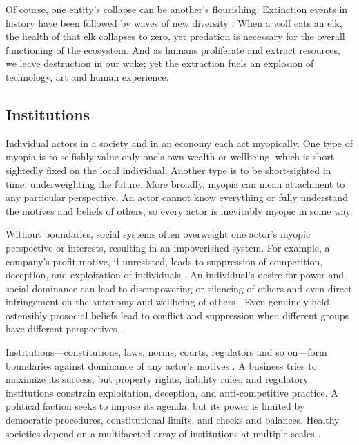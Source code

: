 \documentclass[12pt]{article}
\begin{document}
Of course, one entity's collapse can be another's flourishing. Extinction events in history have been followed by waves of new diversity \citep{feng2017phylogenomics, jablonski2005mass, raup1994role}. When a wolf eats an elk, the health of that elk collapses to zero, yet predation is necessary for the overall functioning of the ecosystem. And as humans proliferate and extract resources, we leave destruction in our wake; yet the extraction fuels an explosion of technology, art and human experience.

\subsection{Institutions}


Individual actors in a society and in an economy each act myopically. One type of myopia is to selfishly value only one's own wealth or wellbeing, which is short-sightedly fixed on the local individual. Another type is to be short-sighted in time, underweighting the future. More broadly, myopia can mean attachment to any particular perspective. An actor cannot know everything or fully understand the motives and beliefs of others, so every actor is inevitably myopic in some way. 


Without boundaries, social systems often overweight one actor's myopic perspective or interests, resulting in an impoverished system. For example, a company's profit motive, if unresisted, leads to suppression of competition, deception, and exploitation of individuals \citep{dalrymple2019anarchy, baran1966monopoly, goldacre2014bad, smith1776inquiry, bakan2006corporation}. An individual's desire for power and social dominance can lead to disempowering or silencing of others and even direct infringement on the autonomy and wellbeing of others \citep{hawley2003prosocial, tepper2000consequences, sidanius2001social}. Even genuinely held, ostensibly prosocial beliefs lead to conflict and suppression when different groups have different perspectives \citep{haidt2012righteous, scott1998seeing, greene2013moral}.

Institutions---constitutions, laws, norms, courts, regulators and so on---form boundaries against dominance of any actor's motives \citep{north1990institutions}. A business tries to maximize its success, but property rights, liability rules, and regulatory institutions constrain exploitation, deception, and anti-competitive practice. A political faction seeks to impose its agenda, but its power is limited by democratic procedures, constitutional limits, and checks and balances. Healthy societies depend on a multifaceted array of institutions at multiple scales \citep{ostrom1990governing, leibo2025societal}.
\end{document}
